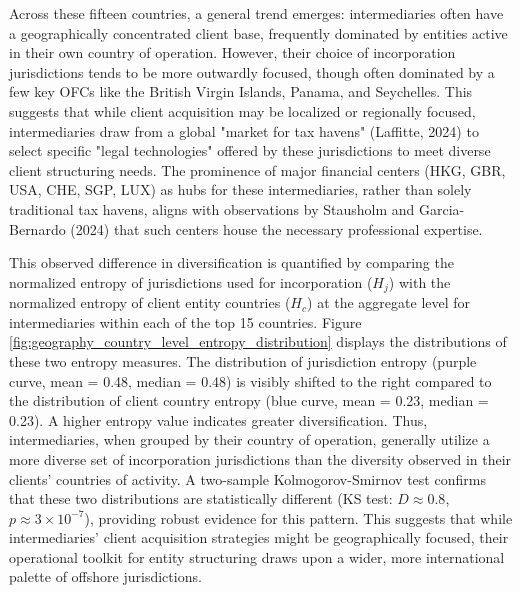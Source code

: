 Across these fifteen countries, a general trend emerges: intermediaries often have a geographically concentrated client base, frequently dominated by entities active in their own country of operation. However, their choice of incorporation jurisdictions tends to be more outwardly focused, though often dominated by a few key OFCs like the British Virgin Islands, Panama, and Seychelles. This suggests that while client acquisition may be localized or regionally focused, intermediaries draw from a global "market for tax havens" (Laffitte, 2024) to select specific "legal technologies" offered by these jurisdictions to meet diverse client structuring needs. The prominence of major financial centers (HKG, GBR, USA, CHE, SGP, LUX) as hubs for these intermediaries, rather than solely traditional tax havens, aligns with observations by Stausholm and Garcia-Bernardo (2024) that such centers house the necessary professional expertise.

This observed difference in diversification is quantified by comparing the normalized entropy of jurisdictions used for incorporation ($H_j$) with the normalized entropy of client entity countries ($H_c$) at the aggregate level for intermediaries within each of the top 15 countries. Figure \ref{fig:geography_country_level_entropy_distribution} displays the distributions of these two entropy measures. The distribution of jurisdiction entropy (purple curve, mean = 0.48, median = 0.48) is visibly shifted to the right compared to the distribution of client country entropy (blue curve, mean = 0.23, median = 0.23). A higher entropy value indicates greater diversification. Thus, intermediaries, when grouped by their country of operation, generally utilize a more diverse set of incorporation jurisdictions than the diversity observed in their clients' countries of activity. A two-sample Kolmogorov-Smirnov test confirms that these two distributions are statistically different (KS test: $D \approx 0.8$, $p \approx 3 \times 10^{-7}$), providing robust evidence for this pattern. This suggests that while intermediaries' client acquisition strategies might be geographically focused, their operational toolkit for entity structuring draws upon a wider, more international palette of offshore jurisdictions.

